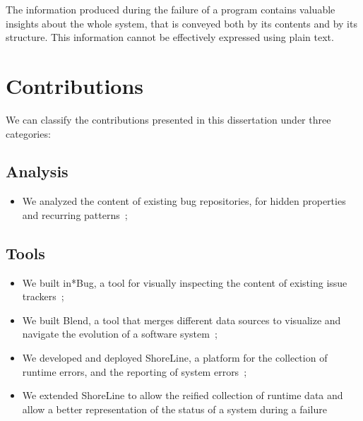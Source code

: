 \begin{framed}
The information produced during the failure of a program contains valuable insights about the whole system, that is conveyed both by its contents and by its structure.
This information cannot be effectively expressed using plain text.
\end{framed}


\section{Contributions}

We can classify the contributions presented in this dissertation under three categories:

\subsection{Analysis}

\begin{itemize}
  \item We analyzed the content of existing bug repositories, for hidden properties and recurring patterns~\cite{DalS2013a,DalS2016a};

\end{itemize}


\subsection{Tools}

\begin{itemize}

    \item We built in*Bug, a tool for visually inspecting the content of existing issue trackers~\cite{DalS2013a,DalS2014a};

    \item We built Blend, a tool that merges different data sources to visualize and navigate the evolution of a software system~\cite{DalS2015b};

    \item We developed and deployed ShoreLine, a platform for the collection of runtime errors, and the reporting of system errors~\cite{DalS2015a};

    \item We extended ShoreLine to allow the reified collection of runtime data and allow a better representation of the status of a system during a failure~\cite{DalS2017b}

\end{itemize}

